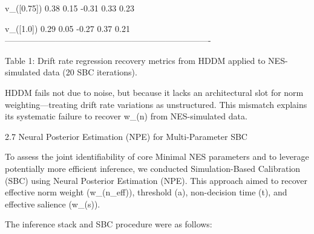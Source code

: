   v_([0.75])                 0.38   0.15   -0.31   0.33      0.23

  v_([1.0])                  0.29   0.05   -0.27   0.37      0.21
  -------------------------------------------------------------------------

Table 1: Drift rate regression recovery metrics from HDDM applied to
NES-simulated data (20 SBC iterations).

HDDM fails not due to noise, but because it lacks an architectural slot
for norm weighting—treating drift rate variations as unstructured. This
mismatch explains its systematic failure to recover w_(n) from
NES-simulated data.

2.7 Neural Posterior Estimation (NPE) for Multi-Parameter SBC

To assess the joint identifiability of core Minimal NES parameters and
to leverage potentially more efficient inference, we conducted
Simulation-Based Calibration (SBC) using Neural Posterior Estimation
(NPE). This approach aimed to recover effective norm weight (w_(n_eff)),
threshold (a), non-decision time (t), and effective salience (w_(s)).

The inference stack and SBC procedure were as follows:

